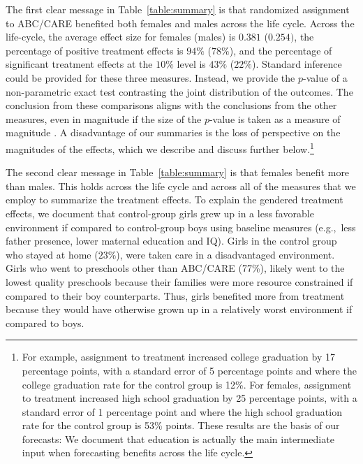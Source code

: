 The first clear message in Table~\ref{table:summary} is that randomized assignment to ABC/CARE benefited both females and males across the life cycle. Across the life-cycle, the average effect size for females (males) is $0.381$ ($0.254)$, the percentage of positive treatment effects is $94\%$ ($78\%$), and the percentage of significant treatment effects at the $10\%$ level is $43\%$ ($22\%$). Standard inference could be provided for these three measures. Instead, we provide the $p$-value of a non-parametric exact test contrasting the joint distribution of the outcomes. The conclusion from these comparisons aligns with the conclusions from the other measures, even in magnitude if the size of the $p$-value is taken as a measure of magnitude \citep{Fisher_1935_Inference_JRSS}. A disadvantage of our summaries is the loss of perspective on the magnitudes of the effects, which we describe and discuss further below.\footnote{For example, assignment to treatment increased college graduation by 17 percentage points, with a standard error of 5 percentage points and where the college graduation rate for the control group is 12\%. For females, assignment to treatment increased high school graduation by 25 percentage points, with a standard error of 1 percentage point and where the high school graduation rate for the control group is 53\% points. These results are the basis of our forecasts: We document that education is actually the main intermediate input when forecasting benefits across the life cycle.}

The second clear message in Table~\ref{table:summary} is that females benefit more than males. This holds across the life cycle and across all of the measures that we employ to summarize the treatment effects. To explain the gendered treatment effects, we document that control-group girls grew up in a less favorable environment if compared to control-group boys using baseline measures (e.g.,\ less father presence, lower maternal education and IQ). Girls in the control group who stayed at home ($23\%$), were taken care in a disadvantaged environment. Girls who went to preschools other than ABC/CARE (77\%), likely went to the lowest quality preschools because their families were more resource constrained if compared to their boy counterparts. Thus, girls benefited more from treatment because they would have otherwise grown up in a relatively worst environment if compared to boys.

